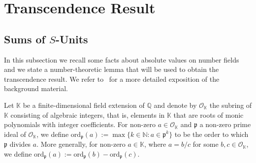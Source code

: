 \documentclass[a4paper,UKenglish,cleveref, autoref, thm-restate]{lipics-v2021}
\begin{document}
\section{Transcendence Result}
\label{sec:main}
\subsection{Sums of $S$-Units}
\label{sec:sums}
In this subsection we recall some facts about absolute values on
number fields and we state a number-theoretic lemma that will be used to obtain
the transcendence result.  We refer
to~\cite{Bilu08} for a more detailed exposition of the background material.

Let $\mathbb K$ be a finite-dimensional field extension of $\mathbb Q$ and denote by
$\mathcal O_{\mathbb K}$ the subring of $\mathbb K$ consisting of algebraic integers, 
that is, elements in $\mathbb K$ that are roots of
monic polynomials with integer coefficients.  
For non-zero $a \in \mathcal O_{\mathbb K}$ and $\mathfrak p$ a non-zero prime ideal of $\mathcal O_{\mathbb K}$,
we define $\mathrm{ord}_{\mathfrak p}(a):=\max\{ k \in \mathbb N : a \in \mathfrak p^k\}$ to be the order to which $\mathfrak p$ divides $a$.  More generally,
for non-zero $a \in \mathbb K$, where $a = b/c$ for some $b,c\in \mathcal O_{\mathbb K}$, we define 
$\mathrm{ord}_{\mathfrak p}(a):=\mathrm{ord}_{\mathfrak p}(b)-\mathrm{ord}_{\mathfrak p}(c)$.
\end{document}
